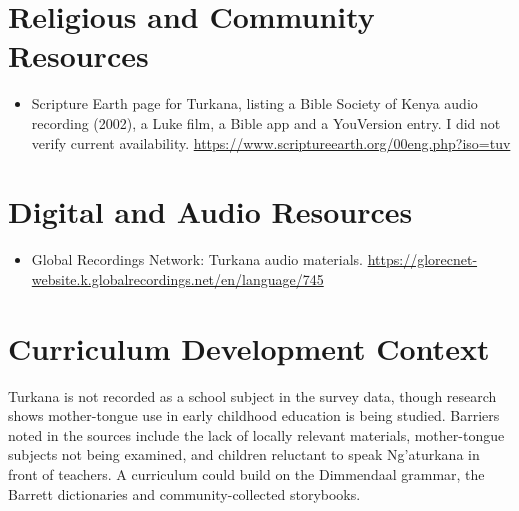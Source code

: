 \documentclass[12pt]{article}
\begin{document}
\section{Religious and Community Resources}
\begin{itemize}
\item Scripture Earth page for Turkana, listing a Bible Society of Kenya audio recording (2002), a Luke film, a Bible app and a YouVersion entry. I did not verify current availability. \url{https://www.scriptureearth.org/00eng.php?iso=tuv}
\end{itemize}

\section{Digital and Audio Resources}
\begin{itemize}
\item Global Recordings Network: Turkana audio materials. \url{https://glorecnet-website.k.globalrecordings.net/en/language/745}
\end{itemize}

\section{Curriculum Development Context}
Turkana is not recorded as a school subject in the survey data, though research shows mother-tongue use in early childhood education is being studied. Barriers noted in the sources include the lack of locally relevant materials, mother-tongue subjects not being examined, and children reluctant to speak Ng'aturkana in front of teachers. A curriculum could build on the Dimmendaal grammar, the Barrett dictionaries and community-collected storybooks.
\end{document}
